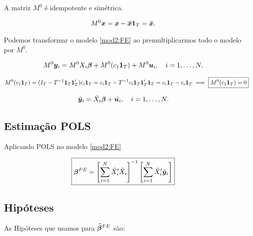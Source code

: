 \documentclass[11pt, oneside, a4paper, article]{article}
\numberwithin{equation}{section}
\begin{document}
\noindent
A matriz $M^{0}$ é idempotente e simétrica.

\begin{align*}
	M^{0} \boldsymbol{x} &= \boldsymbol{x} - \overline{\boldsymbol{x}} \boldsymbol{1}_{T}
	= \ddot{\boldsymbol{x}}.
\end{align*}

Podemos transformar o modelo \eqref{mod2:FE} ao premultiplicarmos todo o modelo por $M^{0}$.

\vspace{-1 em}
\begin{align*} 
M^{0} \boldsymbol{y}_{i} &= M^{0} X_{i} \boldsymbol{\beta} + M^{0} ( c_{1} \boldsymbol{1}_{T} ) + M^{0} \boldsymbol{u}_{i},
\quad i = 1, \dots, N.
\end{align*}

\vspace{-1 em}
\begin{align*} 
M^{0} ( c_{1} \boldsymbol{1}_{T} ) = 
( I_{T} - T^{-1} \boldsymbol{1}_{T} \boldsymbol{1}_{T}' ) c_{i} \boldsymbol{1}_{T} 
=
c_{i} \boldsymbol{1}_{T} - T^{-1} c_{i} \boldsymbol{1}_{T} \boldsymbol{1}_{T}' \boldsymbol{1}_{T} 
=
c_{i} \boldsymbol{1}_{T} - c_{i} \boldsymbol{1}_{T} 
\implies
\boxed{ M^{0} ( c_{1} \boldsymbol{1}_{T} ) = 0 }
\end{align*}

\vspace{-1 em}
\begin{align} \label{mod2:FE}
\ddot{\boldsymbol{y}}_{i} &= \ddot{X}_{i} \boldsymbol{\beta} + \ddot{\boldsymbol{u}_{i}},
\quad i = 1, \dots, N.
\end{align}

\subsection*{Estimação POLS}

Aplicando POLS no modelo \eqref{mod2:FE}

\vspace{-1 em}
\begin{align} \label{beta:pols:FE}
\Aboxed{
\mbs{\beta}^{FE} =
\left[ \sum_{i=1}^{N} \ddot{X}_{i}' \ddot{X}_{i} \right]^{-1}
\left[ \sum_{i=1}^{N} \ddot{X}_{i}' \ddot{\mbs{y}}_{i} \right]
}
\end{align}

\subsection*{Hipóteses}

As Hipóteses que usamos para $\boldsymbol{\widehat{\beta}}^{FE}$ são:
\end{document}
